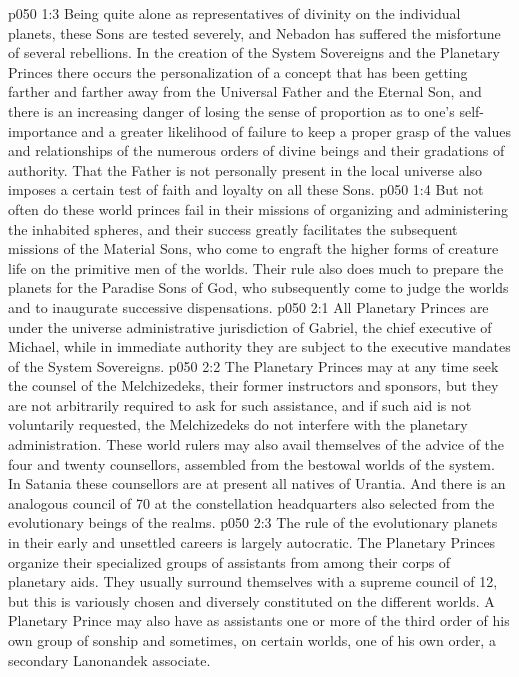 \vs p050 1:3 Being quite alone as representatives of divinity on the individual planets, these Sons are tested severely, and Nebadon has suffered the misfortune of several rebellions. In the creation of the System Sovereigns and the Planetary Princes there occurs the personalization of a concept that has been getting farther and farther away from the Universal Father and the Eternal Son, and there is an increasing danger of losing the sense of proportion as to one’s self\hyp{}importance and a greater likelihood of failure to keep a proper grasp of the values and relationships of the numerous orders of divine beings and their gradations of authority. That the Father is not personally present in the local universe also imposes a certain test of faith and loyalty on all these Sons.
\vs p050 1:4 But not often do these world princes fail in their missions of organizing and administering the inhabited spheres, and their success greatly facilitates the subsequent missions of the Material Sons, who come to engraft the higher forms of creature life on the primitive men of the worlds. Their rule also does much to prepare the planets for the Paradise Sons of God, who subsequently come to judge the worlds and to inaugurate successive dispensations.
\vs p050 2:1 All Planetary Princes are under the universe administrative jurisdiction of Gabriel, the chief executive of Michael, while in immediate authority they are subject to the executive mandates of the System Sovereigns.
\vs p050 2:2 The Planetary Princes may at any time seek the counsel of the Melchizedeks, their former instructors and sponsors, but they are not arbitrarily required to ask for such assistance, and if such aid is not voluntarily requested, the Melchizedeks do not interfere with the planetary administration. These world rulers may also avail themselves of the advice of the four and twenty counsellors, assembled from the bestowal worlds of the system. In Satania these counsellors are at present all natives of Urantia. And there is an analogous council of 70 at the constellation headquarters also selected from the evolutionary beings of the realms.
\vs p050 2:3 The rule of the evolutionary planets in their early and unsettled careers is largely autocratic. The Planetary Princes organize their specialized groups of assistants from among their corps of planetary aids. They usually surround themselves with a supreme council of 12, but this is variously chosen and diversely constituted on the different worlds. A Planetary Prince may also have as assistants one or more of the third order of his own group of sonship and sometimes, on certain worlds, one of his own order, a secondary Lanonandek associate.
